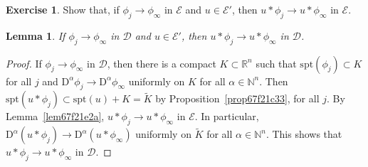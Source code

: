 \documentclass[a4paper,9pt]{amsart}
\newcommand{\scr}[1]{\mathscr{#1}}
\newcommand{\N}{\mathbb{N}}	%
\newcommand{\R}{\mathbb{R}}	%
\newcommand{\Diff}{\mathrm{D}}
\newcommand{\spt}{\mathrm{spt}}
\theoremstyle{plain}
\newtheorem{lemma}[proposition]{Lemma}
\theoremstyle{definition}
\newtheorem{exercise}[proposition]{Exercise}%
\theoremstyle{remark}
\begin{document}
\begin{exercise}\label{ex67f21e52}
	Show that, if $\phi_j\to\phi_\infty$ in $\scr E$ and $u\in\scr E'$, 
	then $u*\phi_j\to u*\phi_\infty$ in $\scr E$.
\end{exercise}

\begin{lemma}\label{lem67f2202d}
	If $\phi_j\to\phi_\infty$ in $\scr D$ and $u\in\scr E'$,
	then $u*\phi_j\to u*\phi_\infty$ in $\scr D$.
\end{lemma}
\begin{proof}
	If $\phi_j\to\phi_\infty$ in $\scr D$, then there is a compact $K\subset\R^n$ such that $\spt(\phi_j)\subset K$ for all $j$ and $\Diff^\alpha\phi_j\to\Diff^\alpha\phi_\infty$ uniformly on $K$ for all $\alpha\in\N^n$.
	Then $\spt(u*\phi_j)\subset \spt(u)+K = \tilde K$ by Proposition~\ref{prop67f21c33}, for all $j$.
	By Lemma~\ref{lem67f21e2a}, $u*\phi_j\to u*\phi_\infty$ in $\scr E$.
	In particular, $\Diff^\alpha(u*\phi_j)\to \Diff^\alpha(u*\phi_\infty)$ uniformly on $\tilde K$ for all $\alpha\in\N^n$.
	This shows that $u*\phi_j\to u*\phi_\infty$ in $\scr D$.
\end{proof}
\end{document}
